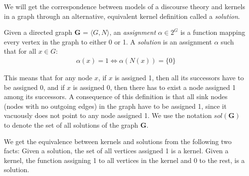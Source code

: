 We will get the correspondence between models of a discourse theory and kernels in a graph through an alternative, equivalent kernel definition called a \textit{solution}.
\begin{definition}
  Given a directed graph \textbf{G} = $\langle G,N \rangle$, an \textit{assignment} $\alpha \in 2^G$ is a function mapping every vertex in the graph to either 0 or 1.
  A \textit{solution} is an assignment $\alpha$ such that for all $x \in G:$
  \begin{align}
    \alpha(x) = 1 \iff \alpha(N(x)) = \{ 0 \}
  \end{align}
\end{definition}
This means that for any node $x$, if $x$ is assigned 1, then all its successors have to be assigned  0, and if $x$ is assigned 0, then there has to exist a node assigned 1 among its successors.
A consequence of this definition is that all sink nodes (nodes with no outgoing edges) in the graph have to be assigned 1, since it vacuously does not point to any node assigned 1.
We use the notation $sol(\mathbf{G})$ to denote the set of all solutions of the graph \textbf{G}.

We get the equivalence between kernels and solutions from the following two facts:
Given a solution, the set of all vertices assigned 1 is a kernel.
Given a kernel, the function assigning 1 to all vertices in the kernel and 0 to the rest, is a solution.
